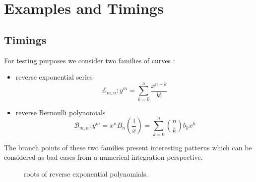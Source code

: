 \documentclass[main.tex]{subfiles}
\begin{document}
  \section{Examples and Timings}\label{sec:examples_timings}

  \subsection{Timings}

  For testing purposes we consider two families of curves :
  \begin{itemize}
      \item reverse exponential series
          \begin{equation}
              \mathcal{E}_{m,n} : y^m = \sum_{k=0}^n\frac{x^{n-k}}{k!}
          \end{equation}
      \item reverse Bernoulli polynomials
          \begin{equation}
              \mathcal{B}_{m,n} : y^m = x^nB_n(\frac1x) = \sum_{k=0}^n\binom nkb_{k}x^k
          \end{equation}
  \end{itemize}

  The branch points of these two families present interesting patterns which can be considered as
  bad cases from a numerical integration perspective.
  \begin{figure}[H]
      \begin{center}
      \end{center}
      \caption{roots of reverse exponential polynomials.}
  \label{fig:roots_exp}
  \end{figure}
\end{document}
